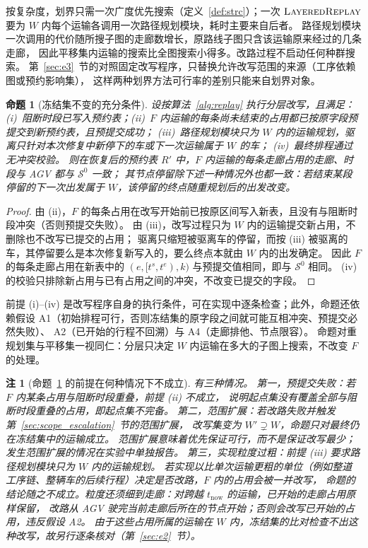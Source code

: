 \documentclass[manuscript,screen,review]{acmart}
\newtheorem{remark}{注}
\newtheorem{prop}{命题}
\begin{document}
按复杂度，划界只需一次广度优先搜索（定义~\ref{def:strc}）；一次 \(\textsc{LayeredReplay}\)
要为 \(W\) 内每个运输各调用一次路径规划模块，耗时主要来自后者。
路径规划模块一次调用的代价随所搜子图的走廊数增长，原路线子图只含该运输原来经过的几条走廊，
因此平移集内运输的搜索比全图搜索小得多。改路过程不启动任何种群搜索。
第~\ref{sec:e3}~节的对照固定改写程序，只替换允许改写范围的来源（工序依赖图或预约影响集），
这样两种划界方法可行率的差别只能来自划界对象。

\begin{prop}[冻结集不变的充分条件]
\label{prop:outside}
设按算法~\ref{alg:replay} 执行分层改写，且满足：
(i)~阻断时段已写入预约表；(ii)~\(F\) 内运输的每条尚未结束的占用都已按原字段预提交到新预约表，且预提交成功；
(iii)~路径规划模块只为 \(W\) 内的运输规划，驱离只针对本次修复中新停下的车或下一次运输属于 \(W\) 的车；
(iv)~最终排程通过无冲突校验。
则在恢复后的预约表 \(R'\) 中，\(F\) 内运输的每条走廊占用的走廊、时段与 AGV 都与 \(\mathcal{S}^0\) 一致；
其节点停留除下述一种情况外也都一致：若结束某段停留的下一次出发属于 \(W\)，该停留的终点随重规划后的出发改变。
\end{prop}

\begin{proof}
由 (ii)，\(F\) 的每条占用在改写开始前已按原区间写入新表，且没有与阻断时段冲突（否则预提交失败）。
由 (iii)，改写过程只为 \(W\) 内的运输提交新占用，不删除也不改写已提交的占用；
驱离只缩短被驱离车的停留，而按 (iii) 被驱离的车，其停留要么是本次修复新写入的，要么终点本就由 \(W\) 内的出发确定。
因此 \(F\) 的每条走廊占用在新表中的 \((e,[t^s,t^e),k)\) 与预提交值相同，即与 \(\mathcal{S}^0\) 相同。
(iv) 的校验只排除新占用与已有占用之间的冲突，不改变已提交的字段。
\end{proof}

前提 (i)--(iv) 是改写程序自身的执行条件，可在实现中逐条检查；此外，命题还依赖假设
A1（初始排程可行，否则冻结集的原字段之间就可能互相冲突、预提交必然失败）、
A2（已开始的行程不回溯）与 A4（走廊排他、节点限容）。
命题对重规划集与平移集一视同仁：分层只决定 \(W\) 内运输在多大的子图上搜索，不改变 \(F\) 的处理。

\begin{remark}[命题~\ref{prop:outside} 的前提在何种情况下不成立]
\label{rem:precommit}
有三种情况。
第一，预提交失败：若 \(F\) 内某条占用与阻断时段重叠，前提 (ii) 不成立，
说明起点集没有覆盖全部与阻断时段重叠的占用，即起点集不完备。
第二，范围扩展：若改路失败并触发第~\ref{sec:scope_escalation}~节的范围扩展，
改写集变为 \(W'\supsetneq W\)，命题只对最终仍在冻结集中的运输成立。
范围扩展意味着优先保证可行，而不是保证改写最少；发生范围扩展的情况在实验中单独报告。
第三，实现粒度过粗：前提 (iii) 要求路径规划模块\emph{只}为 \(W\) 内的运输规划。
若实现以比单次运输更粗的单位（例如整道工序链、整辆车的后续行程）决定是否改路，\(F\) 内的占用会被一并改写，
命题的结论随之不成立。粒度还须细到走廊：对跨越 \(t_{\mathrm{now}}\) 的运输，已开始的走廊占用原样保留，
改路从 AGV 驶完当前走廊后所在的节点开始；否则会改写已开始的占用，违反假设 A2。
由于这些占用所属的运输在 \(W\) 内，冻结集的比对检查不出这种改写，故另行逐条核对（第~\ref{sec:e2}~节）。
\end{remark}
\end{document}
